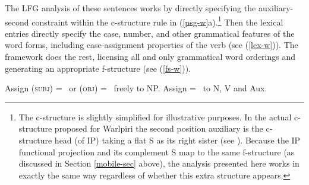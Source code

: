 The LFG analysis of these sentences works by directly specifying the auxiliary-second constraint within the c-structure rule in (\ref{psg-w}a).\footnote{The c-structure is slightly simplified for illustrative purposes. In the actual c-structure proposed for Warlpiri the second position auxiliary is the c-structure head (of IP) taking a flat S as its right sister (see \citealt[225]{austin+bresnan:1996}).  Because the IP functional projection and its complement S map to the same f-structure (as discussed in Section \ref{mobile-sec} above),  the analysis presented here works in exactly the same way regardless of whether this extra structure appears.}  Then the lexical entries directly specify the case, number, and other grammatical features of the word forms, including case-assignment properties of the verb (see (\ref{lex-w})).  The framework does the rest, licensing all and only grammatical word orderings and generating an appropriate f-structure (see (\ref{fs-w})).

\eal  \label{psg-w}
\ex
{
}

\ex 
{
}
\zl


\eal  \label{ann-w}
\ex
{ Assign (\up \textsc{subj}) = \down\ or (\up \textsc{obj}) = \down\ freely to NP.
\ex 
{ Assign \up = \down\ to N, V and Aux.} }
\zl


\eal \label{lex-w} 
\ex 
{\qquad{}}

\ex 
{\qquad{}}

\ex 
{\qquad{}}

\ex 
{\qquad{}}
    
